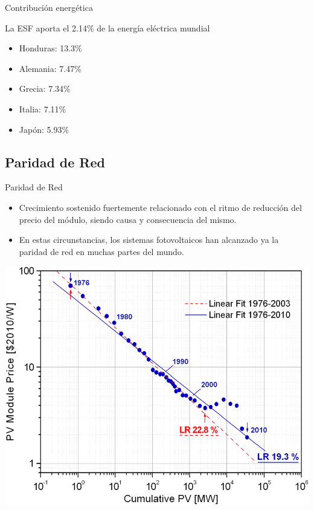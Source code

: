 \documentclass[xcolor={usenames,svgnames,dvipsnames}]{beamer}
\begin{document}
\begin{frame}[label={sec:org9d81681}]{Contribución energética}
\begin{block}{La ESF aporta el 2.14\% de la energía eléctrica mundial}
\begin{itemize}
\item Honduras: 13.3\%
\item Alemania: 7.47\%
\item Grecia: 7.34\%
\item Italia: 7.11\%
\item Japón: 5.93\%
\end{itemize}
\end{block}
\end{frame}

\subsection{Paridad de Red}
\label{sec:org209c9cb}

\begin{frame}[label={sec:org312437c}]{Paridad de Red}
\begin{itemize}
\item Crecimiento sostenido fuertemente relacionado con el ritmo de
reducción del precio del módulo, siendo causa y consecuencia del
mismo.

\item En estas circunstancias, los sistemas fotovoltaicos han alcanzado ya
la paridad de red en muchas partes del mundo.
\end{itemize}
\end{frame}


\begin{frame}[label={sec:org29566c4}]{}
\begin{center}
\includegraphics[width=.9\linewidth]{../figs/CurvaAprendizajeFV_BreyerPiP.png}
\end{center}
\end{frame}
\end{document}
